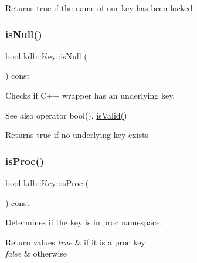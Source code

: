 \begin{DoxyReturn}{Returns}
true if the name of our key has been locked 
\end{DoxyReturn}
\mbox{\label{classkdb_1_1Key_ab70b89caae5fe1e9a2e774733576fa4c}} 
\subsubsection{\texorpdfstring{isNull()}{isNull()}}
{\footnotesize\ttfamily bool kdb\+::\+Key\+::is\+Null (\begin{DoxyParamCaption}{ }\end{DoxyParamCaption}) const\hspace{0.3cm}{\ttfamily [inline]}}



Checks if C++ wrapper has an underlying key. 

\begin{DoxySeeAlso}{See also}
operator bool(), \mbox{\hyperlink{classkdb_1_1Key_a69e621790e5717c56f7275e0b8d5e27c}{is\+Valid()}} 
\end{DoxySeeAlso}
\begin{DoxyReturn}{Returns}
true if no underlying key exists 
\end{DoxyReturn}
\mbox{\label{classkdb_1_1Key_aa89cffb4d2a623920ff9abc086fde241}} 
\subsubsection{\texorpdfstring{isProc()}{isProc()}}
{\footnotesize\ttfamily bool kdb\+::\+Key\+::is\+Proc (\begin{DoxyParamCaption}{ }\end{DoxyParamCaption}) const\hspace{0.3cm}{\ttfamily [inline]}}



Determines if the key is in proc namespace. 


\begin{DoxyRetVals}{Return values}
{\em true} & if it is a proc key \\
\hline
{\em false} & otherwise \\
\hline
\end{DoxyRetVals}
\mbox{\label{classkdb_1_1Key_acf01e9a60bbd0e2768be782d149ac700}} 
